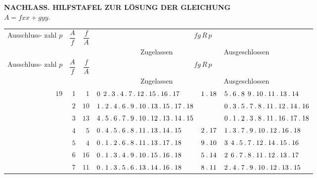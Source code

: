 \clearpage{}
\renewcommand{\BookRunningTitle}{Hilfstafel zur Lösung der Gleichung}
\begin{center}\small
\textbf{NACHLASS. HILFSTAFEL ZUR LÖSUNG DER GLEICHUNG}\\[.4em]
$A=fxx+gyy.$
\end{center}
\begingroup\fontsize{8.7}{10.4}\selectfont\setlength{\tabcolsep}{1.9pt}\renewcommand{\arraystretch}{1.00}
\begin{longtable}{r|r|r|p{125pt}|p{28pt}|p{125pt}}
\hline
\shortstack{Ausschluss-\\zahl\\$p$} & $\dfrac{A}{f}$ & $\dfrac{f}{A}$ & \multicolumn{3}{c}{$fg\,R\,p$}\\\cline{4-6}
& & & \multicolumn{2}{c|}{Zugelassen} & Ausgeschlossen\\\hline
\endfirsthead
\shortstack{Ausschluss-\\zahl\\$p$} & $\dfrac{A}{f}$ & $\dfrac{f}{A}$ & \multicolumn{3}{c}{$fg\,R\,p$}\\\cline{4-6}
& & & \multicolumn{2}{c|}{Zugelassen} & Ausgeschlossen\\\hline
\endhead
$19$ & $1$ & $1$ & $0\mspace{8mu}2\mathbin{.} 3\mathbin{.} 4\mathbin{.} 7\mathbin{.} 12\mathbin{.} 15\mathbin{.} 16\mathbin{.} 17$ & $1\mathbin{.} 18$ & $5\mathbin{.} 6\mathbin{.} 8\mspace{8mu}9\mathbin{.} 10\mathbin{.} 11\mathbin{.} 13\mathbin{.} 14$\\
 & $2$ & $10$ & $1\mathbin{.} 2\mathbin{.} 4\mathbin{.} 6\mathbin{.} 9\mathbin{.} 10\mathbin{.} 13\mathbin{.} 15\mathbin{.} 17\mathbin{.} 18$ &  & $0\mathbin{.} 3\mathbin{.} 5\mathbin{.} 7\mathbin{.} 8\mathbin{.} 11\mathbin{.} 12\mathbin{.} 14\mathbin{.} 16$\\
 & $3$ & $13$ & $4\mathbin{.} 5\mathbin{.} 6\mathbin{.} 7\mathbin{.} 9\mathbin{.} 10\mathbin{.} 12\mathbin{.} 13\mathbin{.} 14\mathbin{.} 15$ &  & $0\mathbin{.} 1\mathbin{.} 2\mathbin{.} 3\mathbin{.} 8\mathbin{.} 11\mathbin{.} 16\mathbin{.} 17\mathbin{.} 18$\\
 & $4$ & $5$ & $0\mathbin{.} 4\mathbin{.} 5\mathbin{.} 6\mathbin{.} 8\mathbin{.} 11\mathbin{.} 13\mathbin{.} 14\mathbin{.} 15$ & $2\mathbin{.} 17$ & $1\mathbin{.} 3\mathbin{.} 7\mathbin{.} 9\mathbin{.} 10\mathbin{.} 12\mathbin{.} 16\mathbin{.} 18$\\
 & $5$ & $4$ & $0\mathbin{.} 1\mathbin{.} 2\mathbin{.} 6\mathbin{.} 8\mathbin{.} 11\mathbin{.} 13\mathbin{.} 17\mathbin{.} 18$ & $9\mathbin{.} 10$ & $3\mspace{8mu}4\mathbin{.} 5\mathbin{.} 7\mathbin{.} 12\mathbin{.} 14\mathbin{.} 15\mathbin{.} 16$\\
 & $6$ & $16$ & $0\mathbin{.} 1\mathbin{.} 3\mathbin{.} 4\mathbin{.} 9\mathbin{.} 10\mathbin{.} 15\mathbin{.} 16\mathbin{.} 18$ & $5\mathbin{.} 14$ & $2\mspace{8mu}6\mathbin{.} 7\mathbin{.} 8\mathbin{.} 11\mathbin{.} 12\mathbin{.} 13\mathbin{.} 17$\\
 & $7$ & $11$ & $0\mathbin{.} 1\mathbin{.} 3\mathbin{.} 5\mathbin{.} 6\mathbin{.} 13\mathbin{.} 14\mathbin{.} 16\mathbin{.} 18$ & $8\mathbin{.} 11$ & $2\mathbin{.} 4\mathbin{.} 7\mathbin{.} 9\mathbin{.} 10\mathbin{.} 12\mathbin{.} 13\mathbin{.} 15$\\

\end{longtable}
